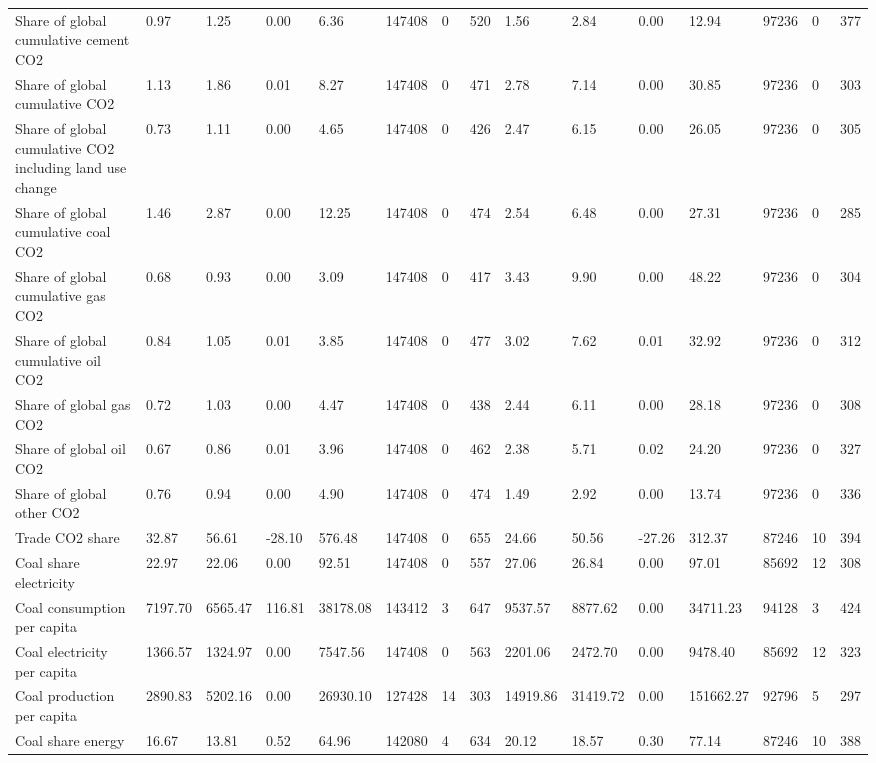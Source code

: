 \begin{longtable}{lllllllllllllll}
\addlinespace
Share of global cumulative cement CO2 & 0.97 & 1.25 & 0.00 & 6.36 & 147408 & 0 & 520 & 1.56 & 2.84 & 0.00 & 12.94 & 97236 & 0 & 377\\
Share of global cumulative CO2 & 1.13 & 1.86 & 0.01 & 8.27 & 147408 & 0 & 471 & 2.78 & 7.14 & 0.00 & 30.85 & 97236 & 0 & 303\\
Share of global cumulative CO2 including land use change & 0.73 & 1.11 & 0.00 & 4.65 & 147408 & 0 & 426 & 2.47 & 6.15 & 0.00 & 26.05 & 97236 & 0 & 305\\
Share of global cumulative coal CO2 & 1.46 & 2.87 & 0.00 & 12.25 & 147408 & 0 & 474 & 2.54 & 6.48 & 0.00 & 27.31 & 97236 & 0 & 285\\
Share of global cumulative gas CO2 & 0.68 & 0.93 & 0.00 & 3.09 & 147408 & 0 & 417 & 3.43 & 9.90 & 0.00 & 48.22 & 97236 & 0 & 304\\
\addlinespace
Share of global cumulative oil CO2 & 0.84 & 1.05 & 0.01 & 3.85 & 147408 & 0 & 477 & 3.02 & 7.62 & 0.01 & 32.92 & 97236 & 0 & 312\\
Share of global gas CO2 & 0.72 & 1.03 & 0.00 & 4.47 & 147408 & 0 & 438 & 2.44 & 6.11 & 0.00 & 28.18 & 97236 & 0 & 308\\
Share of global oil CO2 & 0.67 & 0.86 & 0.01 & 3.96 & 147408 & 0 & 462 & 2.38 & 5.71 & 0.02 & 24.20 & 97236 & 0 & 327\\
Share of global other CO2 & 0.76 & 0.94 & 0.00 & 4.90 & 147408 & 0 & 474 & 1.49 & 2.92 & 0.00 & 13.74 & 97236 & 0 & 336\\
Trade CO2 share & 32.87 & 56.61 & -28.10 & 576.48 & 147408 & 0 & 655 & 24.66 & 50.56 & -27.26 & 312.37 & 87246 & 10 & 394\\
\addlinespace
Coal share electricity & 22.97 & 22.06 & 0.00 & 92.51 & 147408 & 0 & 557 & 27.06 & 26.84 & 0.00 & 97.01 & 85692 & 12 & 308\\
Coal consumption per capita & 7197.70 & 6565.47 & 116.81 & 38178.08 & 143412 & 3 & 647 & 9537.57 & 8877.62 & 0.00 & 34711.23 & 94128 & 3 & 424\\
Coal electricity per capita & 1366.57 & 1324.97 & 0.00 & 7547.56 & 147408 & 0 & 563 & 2201.06 & 2472.70 & 0.00 & 9478.40 & 85692 & 12 & 323\\
Coal production per capita & 2890.83 & 5202.16 & 0.00 & 26930.10 & 127428 & 14 & 303 & 14919.86 & 31419.72 & 0.00 & 151662.27 & 92796 & 5 & 297\\
Coal share energy & 16.67 & 13.81 & 0.52 & 64.96 & 142080 & 4 & 634 & 20.12 & 18.57 & 0.30 & 77.14 & 87246 & 10 & 388\\

\end{longtable}
